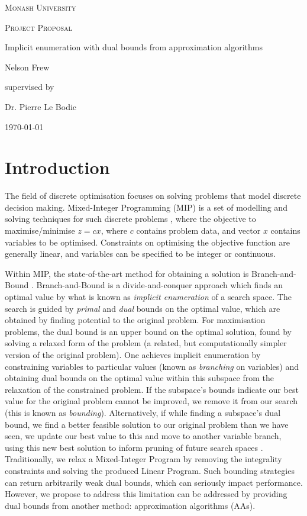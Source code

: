 \documentclass[12pt, a4paper]{article}
\begin{document}
\begin{titlepage}
  \centering
  {\scshape\LARGE Monash University \par}
  \vspace{1cm}
  {\scshape\Large Project Proposal \par}
  \vspace{1.5cm}
  {\huge Implicit enumeration with dual bounds from approximation algorithms\par}
  \vspace{2cm}
  {\Large Nelson Frew\par}
  \vfill
  supervised by\par
  Dr. Pierre Le Bodic
  \vfill
  {\large \today\par}
\end{titlepage}
\tableofcontents
\newpage
\section{Introduction}
The field of discrete optimisation \cite{Hammer} focuses on solving problems that model discrete decision making. Mixed-Integer Programming (MIP) is a set of modelling and solving techniques for such discrete problems \cite{WolseyMIP}, where the objective to maximise/minimise $z = c x$, where $c$ contains problem data, and vector $x$ contains variables to be optimised. Constraints on optimising the objective function are generally linear, and variables can be specified to be integer or continuous. \cite{BOOK:1}

Within MIP, the state-of-the-art method for obtaining a solution is Branch-and-Bound \cite{Mitten}. Branch-and-Bound is a divide-and-conquer approach which finds an optimal value by what is known as \emph{implicit enumeration} of a search space. The search is guided by \emph{primal} and \emph{dual} bounds on the optimal value, which are obtained by finding potential to the original problem. For maximisation problems, the dual bound is an upper bound on the optimal solution, found by solving a relaxed form of the problem (a related, but computationally simpler version of the original problem). One achieves implicit enumeration by constraining variables to particular values (known as \emph{branching} on variables) and obtaining dual bounds on the optimal value within this subspace from the relaxation of the constrained problem. If the subspace's bounds indicate our best value for the original problem cannot be improved, we remove it from our search (this is known as \emph{bounding}). Alternatively, if while finding a subspace's dual bound, we find a better feasible solution to our original problem than we have seen, we update our best value to this and move to another variable branch, using this new best solution to inform pruning of future search spaces \cite{Gomory}. Traditionally, we relax a Mixed-Integer Program by removing the integrality constraints and solving the produced Linear Program. Such bounding strategies can return arbitrarily weak dual bounds, which can seriously impact performance. However, we propose to address this limitation can be addressed by providing dual bounds from another method: approximation algorithms (AAs).  
\end{document}
